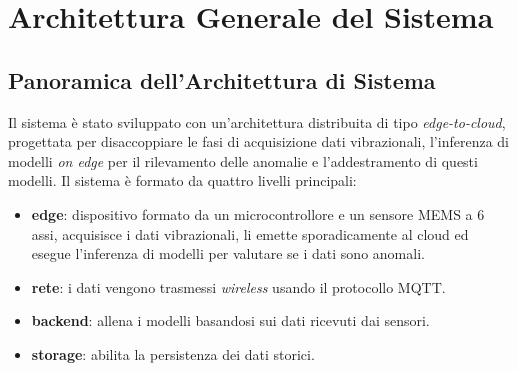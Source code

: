 \chapter{Architettura Generale del Sistema}
\section{Panoramica dell'Architettura di Sistema}

Il sistema è stato sviluppato con un'architettura distribuita di tipo \textit{edge-to-cloud}, progettata per disaccoppiare le fasi di acquisizione dati vibrazionali, l'inferenza di modelli \textit{on edge} per il rilevamento delle anomalie e l'addestramento di questi modelli.
Il sistema è formato da quattro livelli principali:
\begin{itemize}
	\item \textbf{edge}: dispositivo formato da un microcontrollore e un sensore MEMS a 6 assi, acquisisce i dati vibrazionali, li emette sporadicamente al cloud ed esegue l'inferenza di modelli per valutare se i dati sono anomali.
	\item \textbf{rete}: i dati vengono trasmessi \textit{wireless} usando il protocollo MQTT.
	\item \textbf{backend}: allena i modelli basandosi sui dati ricevuti dai sensori.
	\item \textbf{storage}: abilita la persistenza dei dati storici.
\end{itemize}

